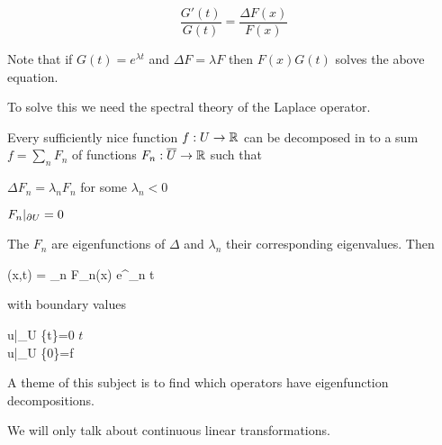 \[\frac{G'(t)}{G(t)} = \frac{\Delta F(x)}{F(x)}\]

Note that if $G(t) = e^{\lambda t}$ and $\Delta F = \lambda F$ then $F(x)G(t)$ solves the above equation.

To solve this we need the spectral theory of the Laplace operator.

\begin{prop}
	Every sufficiently nice function $f: U \to \mathbb{R}$ can be decomposed in to a sum $f=\sum_n F_n$ of functions $F_n: \overline U \to \mathbb{R}$ such that
	\begin{itm}
		\item $\Delta F_n = \lambda_n F_n$ for some $\lambda_n < 0$
		\item $F_n|_{\partial U} = 0$
	\end{itm}
	The $F_n$ are eigenfunctions of $\Delta$ and $\lambda_n$ their corresponding eigenvalues.
	Then
	\begin{eqn}
		(x,t) = \sum_n F_n(x) e^{\lambda_n t}
	\end{eqn}
	with boundary values
	\begin{eqn}
		\begin{cases}
			u|_{\p U \times \{t\}}=0 \text{ for all } $t$ \\
			u|_{\p U \times \{0\}}=f
		\end{cases}
	\end{eqn}
\end{prop}

A theme of this subject is to find which operators have eigenfunction decompositions.

We will only talk about continuous linear transformations.